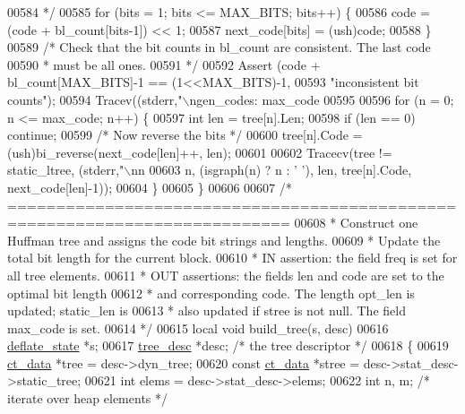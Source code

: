 \begin{DoxyCode}
{{{{{{{{{{00584 \textcolor{comment}{     */}
00585     \textcolor{keywordflow}{for} (bits = 1; bits <= MAX\_BITS; bits++) \{
00586         code = (code + bl\_count[bits-1]) << 1;
00587         next\_code[bits] = (ush)code;
00588     \}
00589     \textcolor{comment}{/* Check that the bit counts in bl\_count are consistent. The last code}
00590 \textcolor{comment}{     * must be all ones.}
00591 \textcolor{comment}{     */}
00592     Assert (code + bl\_count[MAX\_BITS]-1 == (1<<MAX\_BITS)-1,
00593             \textcolor{stringliteral}{"inconsistent bit counts"});
00594     Tracev((stderr,\textcolor{stringliteral}{"\(\backslash\)ngen\_codes: max\_code %
00595 
00596     \textcolor{keywordflow}{for} (n = 0;  n <= max\_code; n++) \{
00597         \textcolor{keywordtype}{int} len = tree[n].Len;
00598         \textcolor{keywordflow}{if} (len == 0) \textcolor{keywordflow}{continue};
00599         \textcolor{comment}{/* Now reverse the bits */}
00600         tree[n].Code = (ush)bi\_reverse(next\_code[len]++, len);
00601 
00602         Tracecv(tree != static\_ltree, (stderr,\textcolor{stringliteral}{"\(\backslash\)nn %
00603              n, (isgraph(n) ? n : \textcolor{charliteral}{' '}), len, tree[n].Code, next\_code[len]-1));
00604     \}
00605 \}
00606 
00607 \textcolor{comment}{/* ===========================================================================}
00608 \textcolor{comment}{ * Construct one Huffman tree and assigns the code bit strings and lengths.}
00609 \textcolor{comment}{ * Update the total bit length for the current block.}
00610 \textcolor{comment}{ * IN assertion: the field freq is set for all tree elements.}
00611 \textcolor{comment}{ * OUT assertions: the fields len and code are set to the optimal bit length}
00612 \textcolor{comment}{ *     and corresponding code. The length opt\_len is updated; static\_len is}
00613 \textcolor{comment}{ *     also updated if stree is not null. The field max\_code is set.}
00614 \textcolor{comment}{ */}
00615 local \textcolor{keywordtype}{void} build\_tree(s, desc)
00616     \hyperlink{structinternal__state}{deflate\_state} *s;
00617     \hyperlink{structtree__desc__s}{tree\_desc} *desc; \textcolor{comment}{/* the tree descriptor */}
00618 \{
00619     \hyperlink{structct__data__s}{ct\_data} *tree         = desc->dyn\_tree;
00620     \textcolor{keyword}{const} \hyperlink{structct__data__s}{ct\_data} *stree  = desc->stat\_desc->static\_tree;
00621     \textcolor{keywordtype}{int} elems             = desc->stat\_desc->elems;
00622     \textcolor{keywordtype}{int} n, m;          \textcolor{comment}{/* iterate over heap elements */}
}}}}}}}}}}}}
\end{DoxyCode}
